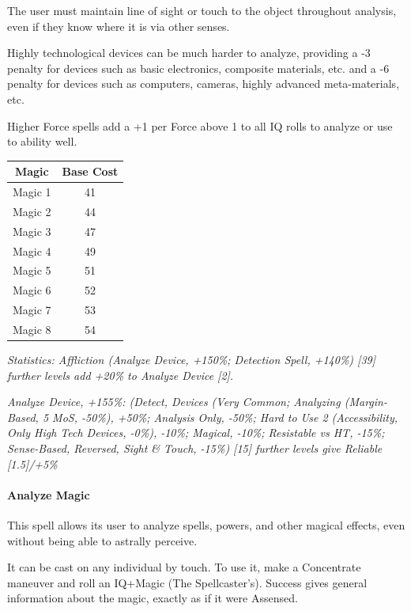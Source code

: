 \begin{multicols*}{3}
	The user must maintain line of sight or touch to the object throughout analysis, even if they know where it is via other senses.
	
	Highly technological devices can be much harder to analyze, providing a -3 penalty for devices such as basic electronics, composite materials, etc. and a -6 penalty for devices such as computers, cameras, highly advanced meta-materials, etc.
	
	Higher Force spells add a +1 per Force above 1 to all IQ rolls to analyze or use to ability well.
	
	\begin{center}
		\begin{tabular}{|c|c|}
			\hline
			Magic & Base Cost \\
			\hline
			\hline
			Magic 1 & 41 \\
			Magic 2 & 44 \\
			Magic 3 & 47 \\
			Magic 4 & 49 \\
			Magic 5 & 51 \\
			Magic 6 & 52 \\
			Magic 7 & 53 \\
			Magic 8 & 54 \\
			\hline
		\end{tabular}
	\end{center}
	
	\textcolor{OliveGreen}{\textit{ Statistics: Affliction (Analyze Device, +150\%; Detection Spell, +140\%) [39] further levels add +20\% to Analyze Device [2].}}
	
	\textcolor{OliveGreen}{\textit{Analyze Device, +155\%: (Detect, Devices (Very Common; Analyzing (Margin-Based, 5 MoS, -50\%), +50\%; Analysis Only, -50\%; Hard to Use 2 (Accessibility, Only High Tech Devices, -0\%), -10\%; Magical, -10\%; Resistable vs HT, -15\%; Sense-Based, Reversed, Sight \& Touch, -15\%) [15] further levels give Reliable [1.5]/+5\%}}
	
	\paragraph{Analyze Magic}
	
	This spell allows its user to analyze spells, powers, and other magical effects, even without being able to astrally perceive.
	
	It can be cast on any individual by touch. To use it, make a Concentrate maneuver and roll an IQ+Magic (The Spellcaster's). Success gives general information about the magic, exactly as if it were Assensed.
	

\end{multicols*}
